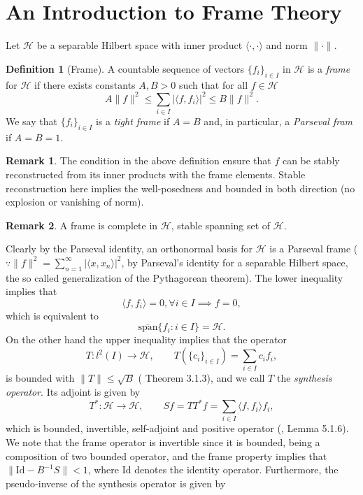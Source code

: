 \documentclass[reqno,10pt]{amsart}
\theoremstyle{plain}
\theoremstyle{definition}
\newtheorem{defn}{Definition}
\newtheorem{rem}{Remark}
\newcommand{\cal}[1]{\mathcal{#1}}
\begin{document}
    \section{\bf An Introduction to Frame Theory} \label{appendix:B}
    \noindent Let $\cal H$ be a separable Hilbert space with inner product $\langle\cdot,\cdot\rangle$ and norm $\|\cdot\|$.
    \begin{defn}[Frame]
        A countable sequence of vectors $\{f_i\}_{i\in I}$ in $\cal H$ is a {\it frame} for $\cal H$ if there exists constants $A,B > 0$ such that for all $f \in \cal H$
        $$ A\|f\|^2 \leq \sum_{i\in I} |\langle f,f_i\rangle|^2 \leq B\|f\|^2.$$
        We say that $\{f_i\}_{i\in I}$ is a {\it tight frame} if $A = B$ and, in particular, a {\it Parseval fram} if $A = B = 1$. 
    \end{defn}
    \begin{rem}
        The condition in the above definition ensure that $f$ can be stably reconstructed from its inner products with the frame elements. Stable reconstruction here implies the well-posedness and bounded in both direction (no explosion or vanishing of norm).
    \end{rem}
    \begin{rem}
        A frame is complete in $\cal H$, stable spanning set of $\cal H$.
    \end{rem}
    Clearly by the Parseval identity, an orthonormal basis for $\cal H$ is a Parseval frame ($\because \|f\|^2 = \sum_{n=1}^{\infty}|\langle x,x_n\rangle|^2$, by Parseval's identity for a separable Hilbert space, the so called generalization of the Pythagorean theorem). The lower inequality implies that 
    $$ \langle f,f_i\rangle = 0, \forall i \in I \implies f = 0,$$
    which is equivalent to 
    $$ \overline{\text{span}}\{f_i : i \in I\} = \cal H.$$
    On the other hand the upper inequality implies that the operator
    $$ T:l^2(I) \to \cal H, \qquad T(\{c_i\}_{i\in I}) = \sum_{i\in I} c_if_i,$$
    is bounded with $\|T\| \leq \sqrt{B}$ (\cite{Christensen2008-gk} Theorem 3.1.3), and we call $T$ the {\it synthesis operator}. Its adjoint is given by 
    $$ T^* : \cal H \to \cal H, \qquad Sf = TT^*f = \sum_{i\in I} \langle f,f_i\rangle f_i,$$
    which is bounded, invertible, self-adjoint and positive operator (\cite{Christensen2008-gk}, Lemma 5.1.6). We note that the frame operator is invertible since it is bounded, being a composition of two bounded operator, and the frame property implies that $\|\text{Id} - B^{-1}S\| < 1$, where Id denotes the identity operator. Furthermore, the pseudo-inverse of the synthesis operator is given by
\end{document}
